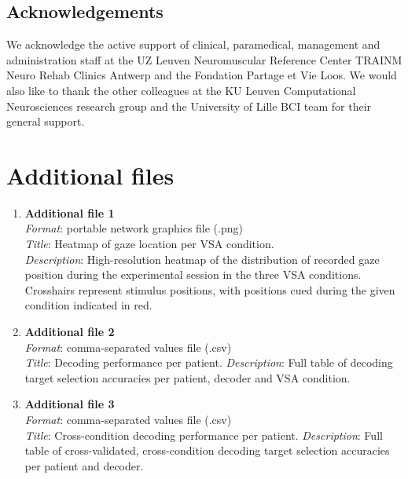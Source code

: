 \documentclass{article}
\begin{document}
\subsection*{Acknowledgements}
We acknowledge the active support of clinical, paramedical, management and
administration staff at the UZ Leuven Neuromuscular Reference Center
TRAINM Neuro Rehab Clinics Antwerp and the Fondation Partage et Vie Loos.
We would also like to thank the other colleagues at the KU Leuven Computational
Neurosciences research group and the University of Lille BCI team
for their general support.

\section*{Additional files}

\begin{enumerate}
	\item \textbf{Additional file 1} \\
	      \emph{Format}: portable network graphics file (.png) \\
	      \emph{Title}: Heatmap of gaze location per VSA condition.\\
	      \emph{Description}: High-resolution heatmap of the distribution of recorded
	      gaze position during the experimental session in the three VSA
	      conditions.
	      Crosshairs represent stimulus positions, with positions
	      cued during the given condition indicated in red.
	\item \textbf{Additional file 2} \\
	      \emph{Format}: comma-separated values file (.csv) \\
	      \emph{Title}: Decoding performance per patient.
	      \emph{Description}: Full table of decoding target selection accuracies
	      per patient, decoder and VSA condition.
	\item \textbf{Additional file 3} \\
	      \emph{Format}: comma-separated values file (.csv) \\
	      \emph{Title}: Cross-condition decoding performance per patient.
	      \emph{Description}: Full table of cross-validated, cross-condition
	      decoding target selection accuracies per patient and decoder.
\end{enumerate}


\printbibliography%


\appendix


\end{document}
